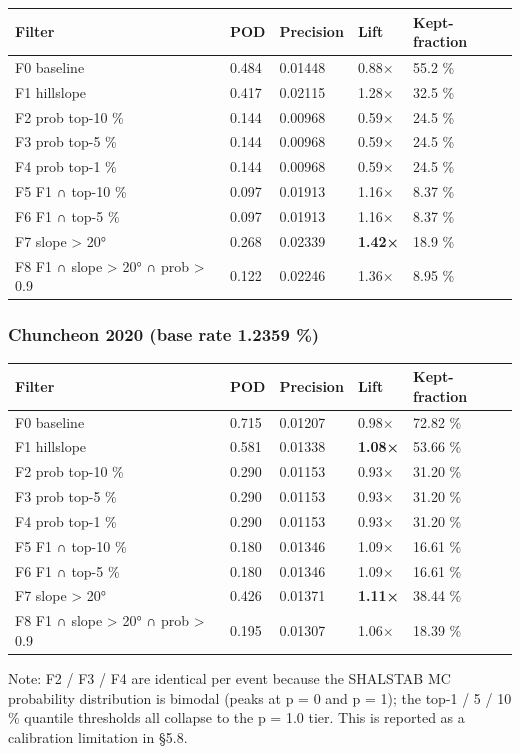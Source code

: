 \documentclass[11pt,a4paper]{article}
\newcounter{none}
\begin{document}
{\def\LTcaptype{none} %
\begin{longtable}[]{@{}lllll@{}}
\toprule\noalign{}
Filter & POD & Precision & Lift & Kept-fraction \\
\midrule\noalign{}
\endhead
\bottomrule\noalign{}
\endlastfoot
F0 baseline & 0.484 & 0.01448 & 0.88× & 55.2 \% \\
F1 hillslope & 0.417 & 0.02115 & 1.28× & 32.5 \% \\
F2 prob top-10 \% & 0.144 & 0.00968 & 0.59× & 24.5 \% \\
F3 prob top-5 \% & 0.144 & 0.00968 & 0.59× & 24.5 \% \\
F4 prob top-1 \% & 0.144 & 0.00968 & 0.59× & 24.5 \% \\
F5 F1 ∩ top-10 \% & 0.097 & 0.01913 & 1.16× & 8.37 \% \\
F6 F1 ∩ top-5 \% & 0.097 & 0.01913 & 1.16× & 8.37 \% \\
F7 slope \textgreater{} 20° & 0.268 & 0.02339 & \textbf{1.42×} & 18.9 \% \\
F8 F1 ∩ slope \textgreater{} 20° ∩ prob \textgreater{} 0.9 & 0.122 & 0.02246 & 1.36× & 8.95 \% \\
\end{longtable}
}

\subsubsection{Chuncheon 2020 (base rate 1.2359 \%)}\label{chuncheon-2020-base-rate-1.2359}

{\def\LTcaptype{none} %
\begin{longtable}[]{@{}lllll@{}}
\toprule\noalign{}
Filter & POD & Precision & Lift & Kept-fraction \\
\midrule\noalign{}
\endhead
\bottomrule\noalign{}
\endlastfoot
F0 baseline & 0.715 & 0.01207 & 0.98× & 72.82 \% \\
F1 hillslope & 0.581 & 0.01338 & \textbf{1.08×} & 53.66 \% \\
F2 prob top-10 \% & 0.290 & 0.01153 & 0.93× & 31.20 \% \\
F3 prob top-5 \% & 0.290 & 0.01153 & 0.93× & 31.20 \% \\
F4 prob top-1 \% & 0.290 & 0.01153 & 0.93× & 31.20 \% \\
F5 F1 ∩ top-10 \% & 0.180 & 0.01346 & 1.09× & 16.61 \% \\
F6 F1 ∩ top-5 \% & 0.180 & 0.01346 & 1.09× & 16.61 \% \\
F7 slope \textgreater{} 20° & 0.426 & 0.01371 & \textbf{1.11×} & 38.44 \% \\
F8 F1 ∩ slope \textgreater{} 20° ∩ prob \textgreater{} 0.9 & 0.195 & 0.01307 & 1.06× & 18.39 \% \\
\end{longtable}
}

Note: F2 / F3 / F4 are identical per event because the SHALSTAB MC probability distribution is bimodal (peaks at p = 0 and p = 1); the top-1 / 5 / 10 \% quantile thresholds all collapse to the p = 1.0 tier. This is reported as a calibration limitation in §5.8.
\end{document}
